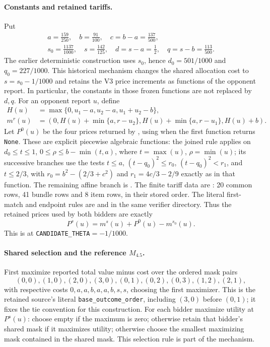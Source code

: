 \paragraph{Constants and retained tariffs.}
Put
\[
\begin{gathered}
 a=\frac{159}{250},\quad b=\frac{91}{100},\quad c=b-a=\frac{137}{500},\\
 s_0=\frac{1137}{1000},\quad s=\frac{142}{125},\quad
 d=s-a=\frac12,\quad q=s-b=\frac{113}{500}.
\end{gathered}
\]
The earlier deterministic construction uses $s_0$, hence
$d_0=501/1000$ and $q_0=227/1000$. This historical mechanism changes the shared
allocation cost to $s=s_0-1/1000$ and retains the V3 price increments as
functions of the opponent report. In particular, the constants in those
frozen functions are not replaced by $d,q$.
For an opponent report $u$, define
\[
\begin{split}
 H(u)&=\max\{0,u_1-a,u_2-a,u_1+u_2-b\},\\
 m^r(u)&=(0,H(u)+\min\{a,r-u_2\},
                 H(u)+\min\{a,r-u_1\},H(u)+b).
\end{split}
\]
Let $P^0(u)$ be the four prices returned by
, using
 when the first
function returns \texttt{None}. These are explicit piecewise algebraic
functions: the joined rule applies on
$d_0\le t\le1$, $0\le\rho\le b-\min(t,a)$, where
$t=\max(u)$, $\rho=\min(u)$; its successive branches use the tests
$t\le a$, $(t-q_0)^2\le r_0$, $(t-q_0)^2<r_1$, and $t\le2/3$, with
$r_0=b^2-(2/3+c^2)$ and $r_1=4c/3-2/9$ exactly as in that function.
The remaining affine branch is
.
The finite tariff data are
: 20 common rows, 41 bundle
rows and 8 item rows, in their stored order. The literal first-match and
endpoint rules are  and
 in the same verifier directory.
Thus the retained prices used by both bidders are exactly
\begin{equation}\label{eq:active-retained-prices}
 P^s(u)=m^s(u)+P^0(u)-m^{s_0}(u).
\end{equation}
This is 
at \texttt{CANDIDATE\_THETA}$=-1/1000$.

\paragraph{Shared selection and the reference $M_{4.5}$.}
First maximize reported total value minus cost over the ordered mask pairs
\[
 (0,0),(1,0),(2,0),(3,0),(0,1),(0,2),(0,3),(1,2),(2,1),
\]
with respective costs $0,a,a,b,a,a,b,s,s$, choosing the first maximizer.
This is the retained source's literal \texttt{base\_outcome\_order}, including
$(3,0)$ before $(0,1)$; it fixes the tie convention for this construction.
For each bidder maximize utility at $P^s(u)$: choose empty if the maximum
is zero; otherwise retain that bidder's shared mask if it maximizes utility;
otherwise choose the smallest maximizing mask contained in the shared mask.
This selection rule is part of the mechanism.

